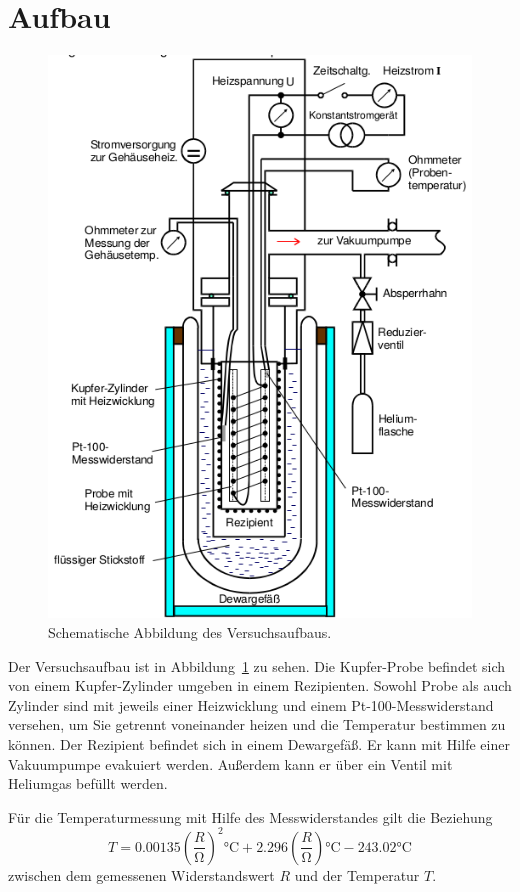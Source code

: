 \cite{FP}

\section{Aufbau}
\begin{figure}
\centering
\includegraphics[scale=0.5]{bilder/setup.png}
\caption{Schematische Abbildung des Versuchsaufbaus. \cite{FP}}
\label{fig:aufbau}
\end{figure}
Der Versuchsaufbau ist in Abbildung~\ref{fig:aufbau} zu sehen. 
Die Kupfer-Probe  befindet sich von einem Kupfer-Zylinder umgeben 
in einem Rezipienten. Sowohl Probe als auch Zylinder sind mit jeweils einer 
Heizwicklung und einem Pt-100-Messwiderstand versehen, um Sie getrennt 
voneinander heizen und die Temperatur bestimmen zu können.
Der Rezipient befindet sich in einem Dewargefäß. Er kann mit Hilfe einer 
Vakuumpumpe evakuiert werden. Außerdem kann er über ein Ventil mit 
Heliumgas befüllt werden.

Für die Temperaturmessung mit Hilfe des Messwiderstandes gilt die Beziehung
\begin{equation}
T = 0.00135 \left(\frac{R}{\si{\ohm}}\right)^2 \si{\celsius}+ 2.296 
\left(\frac{R}{\si{\ohm}} \right) \si{\celsius}-243.02 \si{\celsius}
\label{eq:T_berechnung}
\end{equation}
zwischen dem gemessenen Widerstandswert $R$ und der Temperatur $T$.
